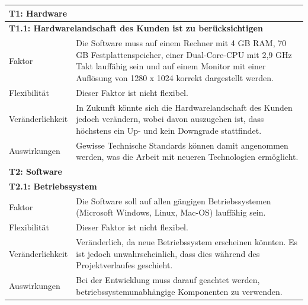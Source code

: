 \documentclass[fontsize=12pt,paper=a4,twoside]{scrartcl}
\begin{document}
\begin{tabularx}{\textwidth}{|l|X|}
\hline
\multicolumn{2}{|l|}{\textbf{T1: Hardware}}\\\hline
\multicolumn{2}{|l|}{\textbf{T1.1: Hardwarelandschaft des Kunden ist zu berücksichtigen}}\\\hline
Faktor & Die Software muss auf einem Rechner mit 4 GB RAM, 70 GB Festplattenspeicher, einer Dual-Core-CPU mit 2,9 GHz Takt lauffähig sein und auf einem Monitor mit einer Auflösung von 1280 x 1024 korrekt dargestellt werden.  \\\hline
 Flexibilität & Dieser Faktor ist nicht flexibel. \\\hline
 Veränderlichkeit & In Zukunft könnte sich die Hardwarelandschaft des Kunden jedoch verändern, wobei davon auszugehen ist, dass höchstens ein Up- und kein Downgrade stattfindet. \\\hline
 Auswirkungen & Gewisse Technische Standards können damit angenommen werden, was die Arbeit mit neueren Technologien ermöglicht.\\\hline
\multicolumn{2}{|l|}{\textbf{T2: Software}}\\\hline
\multicolumn{2}{|l|}{\textbf{T2.1: Betriebssystem}}\\\hline
Faktor & Die Software soll auf allen gängigen Betriebssystemen (Microsoft Windows, Linux, Mac-OS) lauffähig sein.  \\\hline
 Flexibilität & Dieser Faktor ist nicht flexibel. \\\hline
 Veränderlichkeit & Veränderlich, da neue Betriebssystem erscheinen könnten. Es ist jedoch unwahrscheinlich, dass dies während des Projektverlaufes geschieht.\\\hline
 Auswirkungen & Bei der Entwicklung muss darauf geachtet werden, betriebssystemunabhängige Komponenten zu verwenden.\\\hline
 \end{tabularx} \newpage
 
\end{document}
